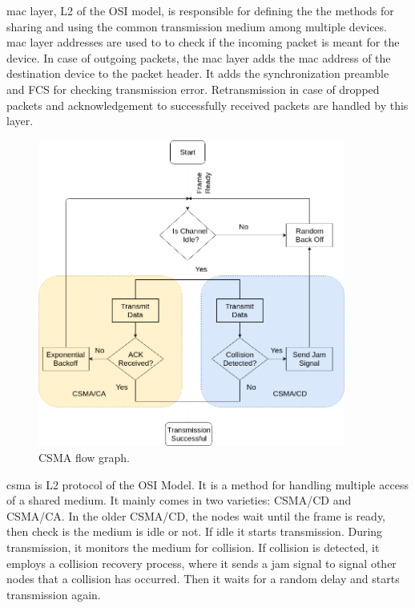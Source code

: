 \ac{mac} layer, \ac{L2} of the \ac{OSI} model, is responsible for defining the the methods for sharing and using the common transmission medium among multiple devices.
\ac{mac} layer addresses are used to to check if the incoming packet is meant for the device.
In case of outgoing packets, the \ac{mac} layer adds the \ac{mac} address of the destination device to the packet header.
It adds the synchronization preamble and \ac{FCS} for checking transmission error.
Retransmission in case of dropped packets and acknowledgement to successfully received packets are handled by this layer.\\

\begin{figure}[h!]
\centering
\includegraphics[width=0.9\textwidth]{Figure/CSMA.png}
\caption{CSMA flow graph.}
\label{Csma_flow}
\end{figure}

\ac{csma} is \ac{L2} protocol of the OSI Model. 
It is a method for handling multiple access of a shared medium.
It mainly comes in two varieties: \ac{CSMA/CD}  and \ac{CSMA/CA}. In the older \ac{CSMA/CD}, the nodes wait until the frame is ready, then check is the medium is idle or not.
If idle it starts transmission.
During transmission, it monitors the medium for collision.
If collision is detected, it employs a collision recovery process, where it sends a jam signal to signal other nodes that a collision has occurred.
Then it waits for a  random delay and starts transmission again.\\

